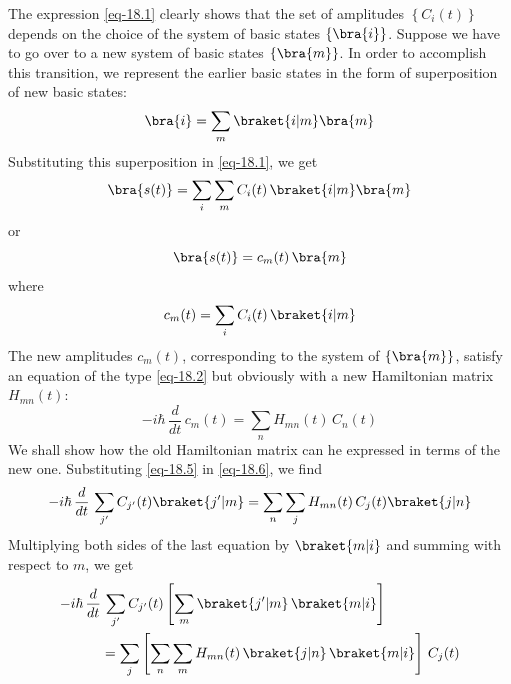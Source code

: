 \documentclass[a4paper,sfsidenotes,colorlinks=true]{tufte-book}
\numberwithin{equation}{section}
\numberwithin{figure}{section}
\begin{document}
The expression \ref{eq-18.1} clearly shows that the set of amplitudes
$\left \{ C_{i} (t) \right \}$ depends on the choice of the system of
basic states $ \left \{ \bra{i} \right \} $. Suppose we have to go over
to a new system of basic states $ \left \{ \bra{m} \right\}$. In
order to accomplish this transition, we represent the earlier basic
states in the form of superposition of new basic states: 
\begin{equation}%
\bra{i} = \sum_{m} \braket{i|m} \bra{m}
\label{eq-18.3}
\end{equation}
Substituting this superposition in \ref{eq-18.1}, we get 
\begin{equation*}%
\bra{s(t)} = \sum_{i} \sum_{m} C_{i} (t) \, \braket{i|m} \bra{m}
\end{equation*}
or 
\begin{equation}%
\bra{s(t)}  = c_{m}(t) \, \bra{m}
\label{eq-18.4}
\end{equation}
where
\begin{equation}%
c_{m}(t) = \sum_{i} C_{i}(t) \, \braket{i|m}
\label{eq-18.5}
\end{equation}
The new amplitudes $c_{m} (t)$, corresponding to the system of  $ \left\{ \bra{m} \right\}$, satisfy an equation of the type \ref{eq-18.2} but obviously with a new
Hamiltonian matrix $H_{mn} (t)$:
\begin{equation}%
- i \hbar \, \frac{d}{dt} \, c_{m}(t) = \sum_{n} H_{mn} (t) \, C_{n}(t)
\label{eq-18.6}
\end{equation}
We shall show how the old Hamiltonian matrix can he expressed in terms
of the new one. Substituting \ref{eq-18.5} in \ref{eq-18.6}, we find
\begin{equation*}%
- i \hbar \, \frac{d}{dt} \, \sum_{j'} C_{j'}(t) \braket{j'|m} =
\sum_{n} \sum_{j} H_{mn} (t) \, C_{j}(t) \braket{j|n}
\end{equation*}
Multiplying both sides of the last equation by $\braket{m|i}$ and summing with
respect to $m$, we get
\begin{equation*}%
\begin{split}
 - i \hbar \, \frac{d}{dt} & \, \sum_{j'} C_{j'}(t) \left[
 \sum_{m} \braket{j'|m} \, \braket{m|i} \right] \\
 & = \sum_{j} \left[ \sum_{n} \sum_{m} H_{mn} (t) \,
   \braket{j|n} \, \braket{m|i} \right] \, C_{j} (t)
\end{split}
\end{equation*}
\end{document}
